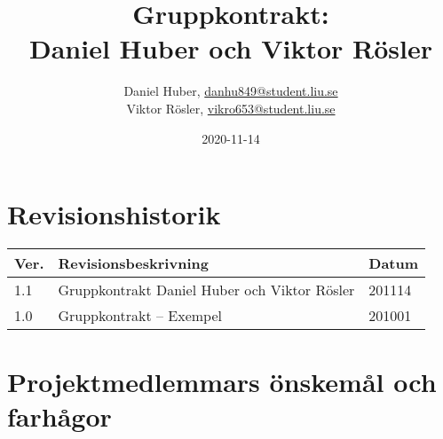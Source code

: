 \documentclass{mall}
\author{Daniel Huber, \url{danhu849@student.liu.se}\\
  Viktor Rösler, \url{vikro653@student.liu.se}\\
  }
\title{Gruppkontrakt:\\ Daniel Huber och Viktor Rösler}
\date{2020-11-14}
\begin{document}
\projectpage
\tableofcontents

\newpage

\section{Revisionshistorik}
\begin{table}[!h]
\begin{tabularx}{\linewidth}{|l|X|l|}
\hline
Ver. & Revisionsbeskrivning & Datum \\\hline
1.1 & Gruppkontrakt Daniel Huber och Viktor Rösler & 201114 \\\hline
1.0 & Gruppkontrakt -- Exempel & 201001 \\\hline
\end{tabularx}
\end{table}

\section{Projektmedlemmars önskemål och farhågor}
\label{prereq}
\end{document}
